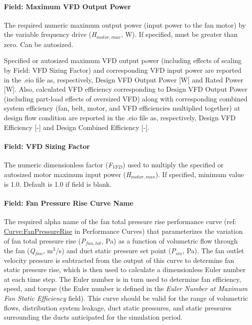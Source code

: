 \paragraph{Field: Maximum VFD Output Power}\label{field-maximum-vfd-output-power}

The required numeric maximum output power (input power to the fan motor) by the variable frequency drive (\emph{H\(_{motor,max}\)}, W). If specified, must be greater than zero. Can be autosized.

Specified or autosized maximum VFD output power (including effects of scaling by Field: VFD Sizing Factor) and corresponding VFD input power are reported in the .eio file as, respectively, Design VFD Output Power {[}W{]} and Rated Power {[}W{]}. Also, calculated VFD efficiency corresponding to Design VFD Output Power (including part-load effects of oversized VFD) along with corresponding combined system efficiency (fan, belt, motor, and VFD efficiencies multiplied together) at design flow condition are reported in the .eio file as, respectively, Design VFD Efficiency {[}-{]} and Design Combined Efficiency {[}-{]}.

\paragraph{Field: VFD Sizing Factor}\label{field-vfd-sizing-factor}

The numeric dimensionless factor (\emph{F\(_{VFD}\)}) used to multiply the specified or autosized motor maximum input power (\emph{H\(_{motor,max}\)}). If specified, minimum value is 1.0. Default is 1.0 if field is blank.

\paragraph{Field: Fan Pressure Rise Curve Name}\label{field-fan-pressure-rise-curve-name}

The required alpha name of the fan total pressure rise performance curve (ref: \hyperref[curvefanpressurerise]{Curve:FanPressureRise} in Performance Curves) that parameterizes the variation of fan total pressure rise (\emph{P\(_{fan,tot}\)}, Pa) as a function of volumetric flow through the fan (\emph{Q\(_{fan}\)}, m\(^{3}\)/s) and duct static pressure set point (\emph{P\(_{sm}\)}, Pa). The fan outlet velocity pressure is subtracted from the output of this curve to determine fan static pressure rise, which is then used to calculate a dimensionless Euler number at each time step. The Euler number is in turn used to determine fan efficiency, speed, and torque (the Euler number is defined in the \emph{Euler Number at Maximum Fan Static Efficiency} field). This curve should be valid for the range of volumetric flows, distribution system leakage, duct static pressures, and static pressures surrounding the ducts anticipated for the simulation period.

